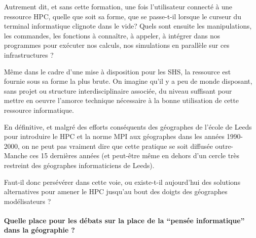 Autrement dit, et sans cette formation, une fois l'utilisateur connecté à une ressource HPC, quelle que soit sa forme, que se passe-t-il lorsque le curseur du terminal informatique clignote dans le vide? Quels sont ensuite les manipulations, les commandes, les fonctions à connaître, à appeler, à intégrer dans nos programmes pour exécuter nos calculs, nos simulations en parallèle sur ces infrastructures ?

Même dans le cadre d'une mise à disposition pour les SHS, la ressource est fournie sous sa forme la plus brute. On imagine qu'il y a peu de monde disposant, sans projet ou structure interdisciplinaire associée, du niveau suffisant pour mettre en oeuvre l'amorce technique nécessaire à la bonne utilisation de cette ressource informatique.

En définitive, et malgré des efforts conséquents des géographes de l'école de Leeds \autocite{Openshaw2000} pour introduire le HPC et la norme MPI aux géographes dans les années 1990-2000, on ne peut pas vraiment dire que cette pratique se soit diffusée outre-Manche ces 15 dernières années (et peut-être même en dehors d'un cercle très restreint des géographes informaticiens de Leeds).

Faut-il donc persévérer dans cette voie, ou existe-t-il aujourd'hui des solutions alternatives pour amener le HPC jusqu'au bout des doigts des géographes modélisateurs ?







\paragraph{Quelle place pour les débats sur la place de la \enquote{pensée informatique} dans la géographie ?}
\label{p:Tournantenseignements}

